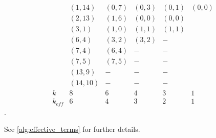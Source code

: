 \documentclass[twocolumn]{article}
\begin{document}
\begin{equation}
    \begin{array}{lccccc}
                & (1, 14)     & (0, 7)   &  (0, 3)& (0,1)&(0,0)\\
                & (2, 13)     & (1, 6)   &  (0, 0)& (0,0)&\\
                & (3, 1)      & (1, 0)   &  (1, 1)& (1,1)&\\
                & (6, 4)      & (3, 2)   &  (3, 2)& -    &\\
                & (7, 4)      & (6, 4)   &  -     & -    &\\
                & (7, 5)      & (7, 5)   &  -     & -    &\\
                & (13, 9)     & -        &  -     & -    &\\
                & (14, 10)    & -        &  -     & -    &\\
       k        & 8           & 6        &  4     & 3    & 1\\
       k_{eff}  & 6           & 4        &  3     & 2    & 1
    \end{array}
\end{equation}.

See \ref{alg:effective_terms} for further details.

\end{document}
